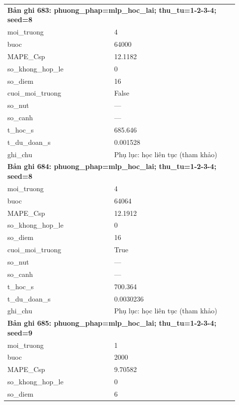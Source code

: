 \begin{longtable}{p{0.43\linewidth}p{0.50\linewidth}}
\midrule
\multicolumn{2}{p{0.95\linewidth}}{\textbf{Bản ghi 683: phuong\_phap=mlp\_hoc\_lai; thu\_tu=1-2-3-4; seed=8}} \\
moi\_\allowbreak truong & 4 \\
buoc & 64000 \\
MAPE\_\allowbreak Csp & 12.1182 \\
so\_\allowbreak khong\_\allowbreak hop\_\allowbreak le & 0 \\
so\_\allowbreak diem & 16 \\
cuoi\_\allowbreak moi\_\allowbreak truong & False \\
so\_\allowbreak nut & — \\
so\_\allowbreak canh & — \\
t\_\allowbreak hoc\_\allowbreak s & 685.646 \\
t\_\allowbreak du\_\allowbreak doan\_\allowbreak s & 0.001528 \\
ghi\_\allowbreak chu & Phụ lục: học liên tục (tham khảo) \\
\midrule
\multicolumn{2}{p{0.95\linewidth}}{\textbf{Bản ghi 684: phuong\_phap=mlp\_hoc\_lai; thu\_tu=1-2-3-4; seed=8}} \\
moi\_\allowbreak truong & 4 \\
buoc & 64064 \\
MAPE\_\allowbreak Csp & 12.1912 \\
so\_\allowbreak khong\_\allowbreak hop\_\allowbreak le & 0 \\
so\_\allowbreak diem & 16 \\
cuoi\_\allowbreak moi\_\allowbreak truong & True \\
so\_\allowbreak nut & — \\
so\_\allowbreak canh & — \\
t\_\allowbreak hoc\_\allowbreak s & 700.364 \\
t\_\allowbreak du\_\allowbreak doan\_\allowbreak s & 0.0030236 \\
ghi\_\allowbreak chu & Phụ lục: học liên tục (tham khảo) \\
\midrule
\multicolumn{2}{p{0.95\linewidth}}{\textbf{Bản ghi 685: phuong\_phap=mlp\_hoc\_lai; thu\_tu=1-2-3-4; seed=9}} \\
moi\_\allowbreak truong & 1 \\
buoc & 2000 \\
MAPE\_\allowbreak Csp & 9.70582 \\
so\_\allowbreak khong\_\allowbreak hop\_\allowbreak le & 0 \\
so\_\allowbreak diem & 6 \\

\end{longtable}
